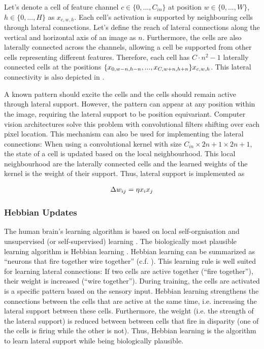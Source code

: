 Let's denote a cell of feature channel $c \in \{0, ..., C_{in}\}$ at position $w \in \{0, ..., W\}$, $h \in \{0, ..., H\}$ as $x_{c,w,h}$.
Each cell's activation is supported by neighbouring cells through lateral connections. Let's define the reach of lateral connections along the vertical and horizontal axis of an image as $n$.
Furthermore, the cells are also laterally connected across the channels, allowing a cell be supported from other cells representing different features.
Therefore, each cell has $C\cdot n^2 - 1$ laterally connected cells at the positions $\{x_{0,w-n,h-n}, ..., x_{C,w+n,h+n}\} \\ x_{c,w,h}$. This lateral connectivity is also depicted in . 

A known pattern should excite the cells and the cells should remain active through lateral support. 
However, the pattern can appear at any position within the image, requiring the lateral support to be position equivariant.
Computer vision architectures solve this problem with convolutional filters shifting over each pixel location. This mechanism can also be used for implementing the lateral connections: When using a convolutional kernel with size $C_{in} \times 2n+1 \times 2n+1$, the state of a cell is updated based on the local neighbourhood. This local neighbourhood are the laterally connected cells and the learned weights of the kernel is the weight of their support.
Thus, lateral support is implemented as


\begin{align}\eqlbl{convlat_1}
	\Delta w_{ij} = \eta x_i x_j
\end{align}


\subsubsection{Hebbian Updates}
The human brain's learning algorithm is based on local self-orgnisation and unsupervised (or self-supervised) learning . The biologically most plausible learning algorithm is Hebbian learning . Hebbian learning can be summarized as ``neurons that fire together wire together'' (c.f. ).
This learning rule is well suited for learning lateral connections: If two cells are active together (``fire together''), their weight is increased (``wire together''). During training, the cells are activated is a specific pattern based on the sensory input. Hebbian learning strengthens the connections between the cells that are active at the same time, i.e. increasing the lateral support between these cells. Furthermore, the weight (i.e. the strength of the lateral support) is reduced between between cells that fire in disparity (one of the cells is firing while the other is not).
Thus, Hebbian learning is the algorithm to learn lateral support while being biologically plausible.

